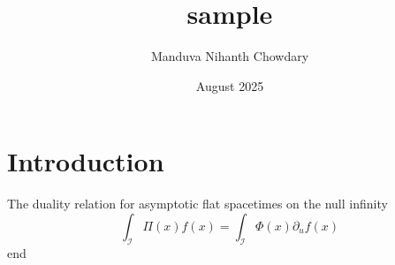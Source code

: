 \documentclass{article}
\title{sample}
\author{Manduva Nihanth Chowdary  }
\date{August 2025}
\begin{document}
\maketitle

\section{Introduction}
The duality relation for asymptotic flat spacetimes on the null infinity
\begin{equation}
    \int_\mathcal{I} \Pi(x)f(x) = \int_\mathcal{I} \Phi(x)\partial_u f(x) 
\end{equation}
end
\end{document}
